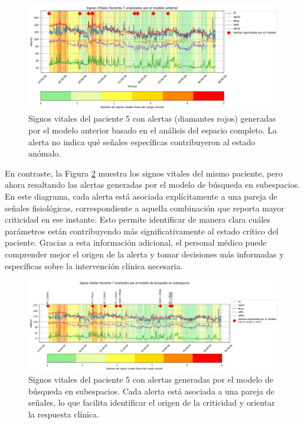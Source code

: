 \begin{figure}[H]
  \centering
  \includegraphics[width=\textwidth]{Images/alertas_modelo_anterior_paciente5.png}
  \caption{Signos vitales del paciente 5 con alertas (diamantes rojos) generadas por el modelo anterior basado en el análisis del espacio completo. La alerta no indica qué señales específicas contribuyeron al estado anómalo.}
  \label{fig:alertas_modelo_anterior_paciente5}
\end{figure}

En contraste, la Figura \ref{fig:alertas_subespacios_paciente5} muestra los signos vitales del mismo paciente, pero ahora resaltando las alertas generadas por el modelo de búsqueda en subespacios. En este diagrama, cada alerta está asociada explícitamente a una pareja de señales fisiológicas, correspondiente a aquella combinación que reporta mayor criticidad en ese instante. Esto permite identificar de manera clara cuáles parámetros están contribuyendo más significativamente al estado crítico del paciente. Gracias a esta información adicional, el personal médico puede comprender mejor el origen de la alerta y tomar decisiones más informadas y específicas sobre la intervención clínica necesaria.

\begin{figure}[H]
  \centering
  \includegraphics[width=\textwidth]{Images/alertas_subespacios_paciente5.png}
  \caption{Signos vitales del paciente 5 con alertas generadas por el modelo de búsqueda en subespacios. Cada alerta está asociada a una pareja de señales, lo que facilita identificar el origen de la criticidad y orientar la respuesta clínica.}
  \label{fig:alertas_subespacios_paciente5}
\end{figure}

